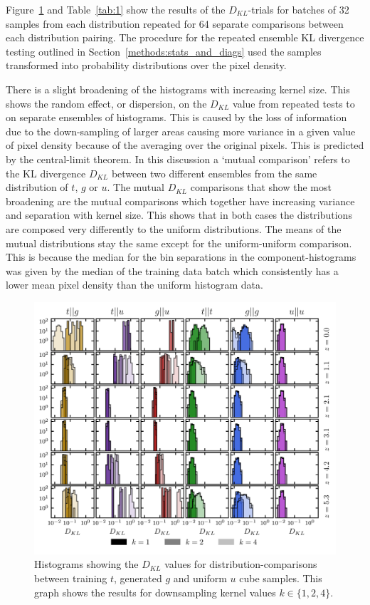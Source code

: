 \documentclass[twocolumn]{article}
\numberwithin{equation}{section}
\begin{document}
Figure~\ref{fig:kl_trials_all} and Table~\ref{tab:1} show the results of the $D_{KL}$-trials for batches of 32 samples from 
each distribution repeated for 64 separate comparisons between each distribution pairing. The procedure for the repeated 
ensemble KL divergence testing outlined in Section~\ref{methods:stats_and_diags} used the samples transformed into 
probability distributions over the pixel density.

There is a slight broadening of the histograms with increasing kernel size. This shows the random effect, or dispersion, 
on the $D_{KL}$ value from repeated tests to on separate ensembles of histograms. This is caused by the loss of information 
due to the down-sampling of larger areas causing more variance in a given value of pixel density because of the averaging 
over the original pixels. This is predicted by the central-limit theorem. In this discussion a `mutual comparison' 
refers to the KL divergence $D_{KL}$ between two different ensembles from the same distribution of $t$, $g$ or $u$. The 
mutual $D_{KL}$ comparisons that show the most broadening are the mutual comparisons which together have increasing 
variance and separation with kernel size. This shows that in both cases the distributions are composed very differently 
to the uniform distributions. The means of the mutual distributions stay the same except for the uniform-uniform comparison. 
This is because the median for the bin separations in the component-histograms was given by the median of the training data 
batch which consistently has a lower mean pixel density than the uniform histogram data. 


\begin{figure}[hbt!]
\includegraphics[width=17cm]{figures/graphs/kl_trials_all_z_train1.png}
\centering
\caption{Histograms showing the $D_{KL}$ values for distribution-comparisons between training $t$, generated $g$ and 
         uniform $u$ cube samples. This graph shows the results for downsampling kernel values $k \in \{1, 2, 4\}$.}
\label{fig:kl_trials_all}
\end{figure}
\end{document}

